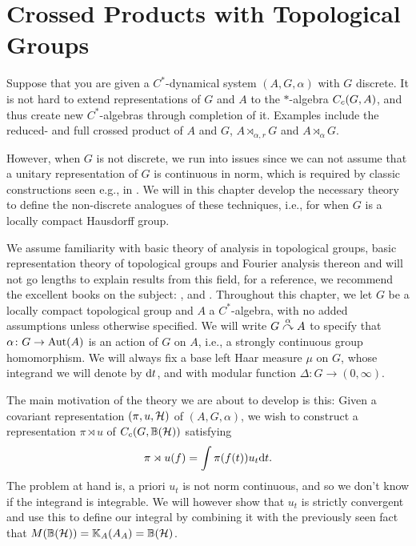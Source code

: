 \chapter{Crossed Products with Topological Groups}
Suppose that you are given a $C^*$-dynamical system $(A,G,\alpha)$ with $G$ discrete. It is not hard to extend representations of $G$ and $A$ to the $*$-algebra $C_c(G,A)$, and thus create new $C^*$-algebras through completion of it. Examples include the reduced- and full crossed product of $A$ and $G$, $A \rtimes_{\alpha,r} G$ and $A \rtimes_{\alpha} G$.

However, when $G$ is not discrete, we run into issues since we can not assume that a unitary representation of $G$ is continuous in norm, which is required by classic constructions seen e.g., in \cite{brown2008c}. We will in this chapter develop the necessary theory to define the non-discrete analogues of these techniques, i.e., for when $G$ is a locally compact Hausdorff group.

We assume familiarity with basic theory of analysis in topological groups, basic representation theory of topological groups and Fourier analysis thereon and will not go lengths to explain results from this field, for a reference, we recommend the excellent books on the subject: \cite{folland2016fourier}, \cite{berg1984harmonic} and \cite{folland2013real}. 
Throughout this chapter, we let $G$ be a locally compact topological group and $A$ a $C^*$-algebra, with no added assumptions unless otherwise specified. We will write $G \stackrel{\alpha}{\curvearrowright} A$ to specify that $\alpha \colon G \to \operatorname{Aut}(A)$ is an action of $G$ on $A$, i.e., a strongly continuous group homomorphism. We will always fix a base left Haar measure $\mu$ on $G$, whose integrand we will denote by $\mathrm{d} t$, and with modular function $\Delta \colon G \to (0,\infty)$. 

The main motivation of the theory we are about to develop is this: Given a covariant representation $(\pi,u,\mathcal{H})$ of $(A,G,\alpha)$, we wish to construct a representation $\pi \rtimes u$ of $C_c(G,\mathbb{B}(\mathcal{H}))$ satisfying 
\begin{align*}
\pi \rtimes u (f) = \int \pi(f(t))u_t \mathrm{d} t.
\end{align*}
The problem at hand is, a priori $u_t$ is not norm continuous, and so we don't know if the integrand is integrable. We will however show that $u_t$ is strictly convergent and use this to define our integral by combining it with the previously seen fact that $M(\mathbb{B}(\mathcal{H})) = \mathbb{K}_A(A_A)= \mathbb{B}(\mathcal{H})$. 

